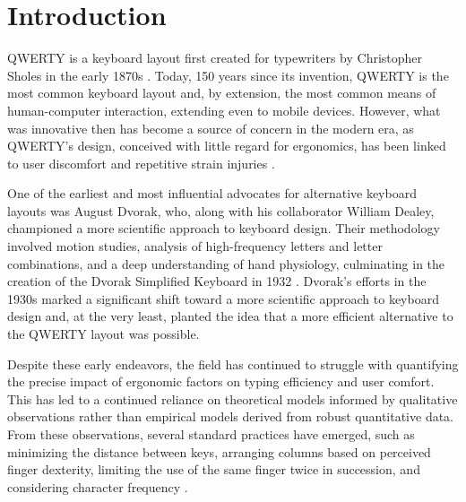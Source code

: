 

\section{Introduction}
QWERTY is a keyboard layout first created for typewriters by Christopher Sholes in the early 1870s \citep{yasuoka2011prehistory}. Today, 150 years since its invention, QWERTY is the most common keyboard layout and, by extension, the most common means of human-computer interaction, extending even to mobile devices. However, what was innovative then has become a source of concern in the modern era, as QWERTY's design, conceived with little regard for ergonomics, has been linked to user discomfort and repetitive strain injuries \citep{amell2000cumulative}.

One of the earliest and most influential advocates for alternative keyboard layouts was August Dvorak, who, along with his collaborator William Dealey, championed a more scientific approach to keyboard design. Their methodology involved motion studies, analysis of high-frequency letters and letter combinations, and a deep understanding of hand physiology, culminating in the creation of the Dvorak Simplified Keyboard in 1932 \citep{hiraga}. Dvorak's efforts in the 1930s marked a significant shift toward a more scientific approach to keyboard design and, at the very least, planted the idea that a more efficient alternative to the QWERTY layout was possible.

Despite these early endeavors, the field has continued to struggle with quantifying the precise impact of ergonomic factors on typing efficiency and user comfort. This has led to a continued reliance on theoretical models informed by qualitative observations rather than empirical models derived from robust quantitative data. From these observations, several standard practices have emerged, such as minimizing the distance between keys, arranging columns based on perceived finger dexterity, limiting the use of the same finger twice in succession, and considering character frequency \citep{light1993typewriter}. %


